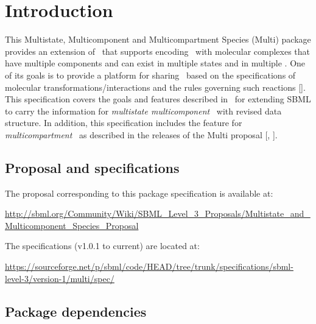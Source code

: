 
\section{Introduction}
\label{def:Introduction}

This Multistate, Multicomponent and Multicompartment Species (Multi) package provides an extension of \SbmlLevelThreeWC\ that supports encoding \smodels\ with molecular complexes that have multiple components and can exist in multiple states and in multiple \compartments. One of its \mBlockChangedBegin{\revTwentyTwentyMarch}goals is\mBlockChangedEnd{\revTwentyTwentyMarch} to provide a platform for sharing \smodels\ based on the specifications of \mBlockChangedBegin{\revTwentyTwentyMarch} molecular transformations/interactions and the rules governing such reactions\mBlockChangedEnd{\revTwentyTwentyMarch} [\cite{ref:simmune2012, ref:scienceSignaling2006, ref:FeretPnas2009, ref:modeler2013}]. This specification covers the goals and features described in \multiOneProposalWC\ for extending SBML to carry the information for \textit{multistate multicomponent} \species\ with revised data structure. In addition, this specification includes the feature for \textit{multicompartment} \species\ as described in the releases of the Multi proposal [\cite{ref:multiproposal280}, \cite{ref:revisedMulti}].

\subsection{Proposal and specifications}
\label{def:Proposal}

The proposal corresponding to this package specification is available at:

\hspace{3ex}\url{http://sbml.org/Community/Wiki/SBML_Level_3_Proposals/Multistate_and_Multicomponent_Species_Proposal}

The specifications (v1.0.1 to current) are located at: 

\hspace{3ex}\url{https://sourceforge.net/p/sbml/code/HEAD/tree/trunk/specifications/sbml-level-3/version-1/multi/spec/}

\subsection{Package dependencies}
\label{def:Package_dependencies}

